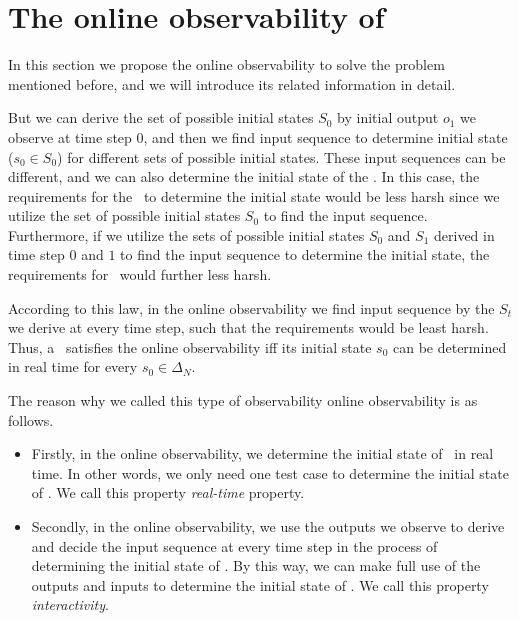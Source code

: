 \section{The online observability of \BCNs}
\label{sec:online}


In this section we propose the online observability to solve the problem mentioned before, and we will introduce its related information in detail. 





But we can derive the set of possible initial states $S_0$ by initial output $o_1$ we observe at time step $0$, and then we find input sequence to determine initial state ($s_0\in S_0$) for different sets of possible initial states. These input sequences can be different, and we can also determine the initial state of the \BCN.
In this case, the requirements for the \BCN\ to determine the initial state would be less harsh since we utilize the set of possible initial states $S_0$ to find the input sequence. Furthermore, if we utilize the sets of possible initial states $S_0$ and $S_1$ derived in time step $0$ and $1$ to find the input sequence to determine the initial state, the requirements for \BCNs\ would further less harsh. 

According to this law, in the online observability we find input sequence by the $S_t$ we derive at every time step, such that the requirements would be least harsh. Thus, a \BCN\ satisfies the online observability iff its initial state $s_0$ can be determined in real time for every $s_0 \in \Delta_N$.


The reason why we called this type of observability online observability is as follows.
\begin{itemize}
  \item Firstly, in the online observability, we determine the initial state of \BCNs\ in real time. In other words, we only need one test case to determine the initial state of \BCNs. We call this property {\em real-time} property.%
  \item  Secondly, in the online observability, we use the outputs we observe to derive and decide the input sequence at every time step in the process of determining the initial state of \BCNs. By this way, we can make full use of the outputs and inputs to determine the initial state of \BCNs. We call this property {\em interactivity}.
\end{itemize} 


